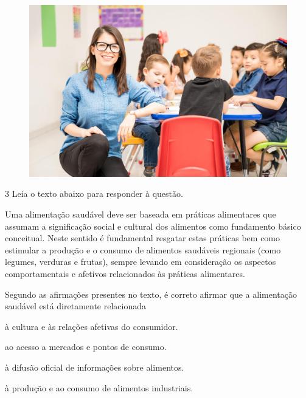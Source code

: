 \begin{figure}[H]
\centering
\includegraphics[width=\textwidth]{./imgSAEB_7_POR/media/image27.png}
\end{figure}

\num{3} Leia o texto abaixo para responder à questão.
\enlargethispage{2\baselineskip}

\begin{myquote}
Uma alimentação saudável deve ser baseada em práticas alimentares que
assumam a significação social e cultural dos alimentos como fundamento
básico conceitual. Neste sentido é fundamental resgatar estas práticas
bem como estimular a produção e o consumo de alimentos saudáveis
regionais (como legumes, verduras e frutas), sempre levando em
consideração os aspectos comportamentais e afetivos relacionados às
práticas alimentares.

\end{myquote}

\pagebreak
Segundo as afirmações presentes no texto, é correto afirmar que a alimentação saudável
está diretamente relacionada

\begin{escolha}

  \item à cultura e às relações afetivas do consumidor.
  
  \item ao acesso a mercados e pontos de consumo.
  
  \item à difusão oficial de informações sobre alimentos.
  
  \item à produção e ao consumo de alimentos industriais.

\end{escolha}

